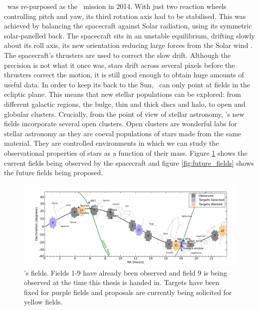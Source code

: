 \kepler\ was re-purposed as the \ktwo\ mission in 2014.
With just two reaction wheels controlling pitch and yaw, its third rotation
axis had to be stabilised.
This was achieved by balancing the spacecraft against Solar radiation, using
its symmetric solar-panelled back.
The spacecraft sits in an unstable equilibrium, drifting slowly about its roll
axis, its new orientation reducing large forces from the Solar wind
\citep{Howell2014}.
The spacecraft's thrusters are used to correct the slow drift.
Although the precision is not what it once was, stars drift across several
pixels before the thrusters correct the motion, it is still good enough to
obtain huge amounts of useful data.
In order to keep its back to the Sun, \kepler\ can only point at fields in the
ecliptic plane.
This means that new stellar populations can be explored: from different
galactic regions, the bulge, thin and thick discs and halo, to open and
globular clusters.
Crucially, from the point of view of stellar astronomy, \kepler's new fields
incorporate several open clusters.
Open clusters are wonderful labs for stellar astronomy as they are coeval
populations of stars made from the same material.
They are controlled environments in which we can study the observational
properties of stars as a function of their mass.
Figure \ref{fig:current_fields} shows the current fields being observed by the
spacecraft and figure \ref{fig:future_fields} shows the future fields being
proposed.

\begin{figure}[p]
\begin{center}
\includegraphics[width=6in, clip=true]{figures/Current_K2_fields.pdf}
\caption[Current \ktwo\ fields]{\ktwo's fields. Fields 1-9 have already been
observed and field 9 is being observed at the time this thesis is handed in.
Targets have been fixed for purple fields and proposals are currently being
solicited for yellow fields.}
\label{fig:current_fields}
\end{center}
\end{figure}

